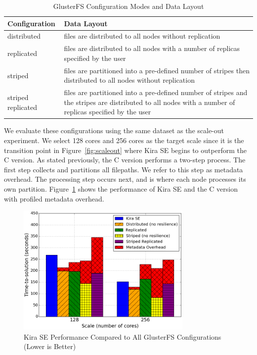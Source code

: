 \documentclass[conference]{IEEEtran}
\newcommand{\up}{\vspace*{-1em}}
\begin{document}
\begin{table}[h]
  \begin{center}
  \caption{GlusterFS Configuration Modes and Data Layout}
    \begin{small}
    \begin{tabular}{ | p{1.65cm} | p{6cm} |}
    \hline
    Configuration & Data Layout \\ \hline \hline
    distributed & files are distributed to all nodes without replication  \\ \hline
    replicated & files are distributed to all nodes with a number of replicas specified by the user \\ \hline  
    striped & files are partitioned into a pre-defined number of stripes then distributed to all nodes without replication \\ \hline
    striped replicated & files are partitioned into a pre-defined number of stripes and the stripes are distributed to all nodes with a number of replicas specified by the user \\ \hline
    \end{tabular}
    \end{small}   
  \label{tb:gluster-conf}     	
  \end{center}
\end{table}

We evaluate these configurations using the same dataset as the scale-out experiment. We
select 128 cores and 256 cores as the target scale since it is the transition point in
Figure~\ref{fig:scaleout} where Kira SE begins to outperform the C version. As stated
previously, the C version performs a two-step process. The first step collects and
partitions all filepaths. We refer to this step as metadata overhead. The processing
step occurs next, and is where each node processes its own partition.
Figure~\ref{fig:allgluster} shows the performance of Kira SE and the C version with
profiled metadata overhead.  

\begin{figure}[h]
	\begin{center}
		\includegraphics[width=85mm]{pictures/allgluster}
		\caption{Kira SE Performance Compared to All GlusterFS Configurations (Lower is Better)
		\label{fig:allgluster}}
		\up\up
  	\end{center}
\end{figure}
\end{document}
